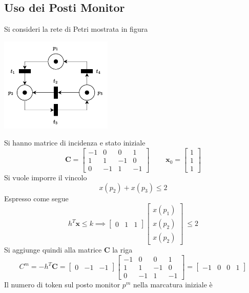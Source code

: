 \documentclass[10pt, letterpaper]{report}
\begin{document}
\subsection{Uso dei Posti Monitor}
Si consideri la rete di Petri mostrata in figura
\begin{center}
    \includegraphics[width=0.4\textwidth]{images/UsoMonitor.drawio.pdf}
\end{center}
Si hanno matrice di incidenza e stato iniziale
$$ \mathbf C=\begin{bmatrix}
    -1 & 0 & 0 & 1\\ 
    1 & 1 & -1 & 0\\ 
    0 & -1 & 1 & -1
\end{bmatrix} \ \ \ \ \ \ \  \ \ \  \mathbf x_0=\begin{bmatrix}
    1 \\ 1 \\ 1
\end{bmatrix}$$
Si vuole imporre il vincolo 
$$ x(p_2)+x(p_3)\le 2$$
Espresso come segue 
$$h^T\mathbf x \le k \implies \begin{bmatrix}
    0 & 1 & 1
\end{bmatrix}\begin{bmatrix}
    x(p_1) \\ x(p_2) \\ x(p_2)
\end{bmatrix}\ \le 2$$
Si aggiunge quindi alla matrice $\mathbf C$ la riga 
$$ C^m=-h^T\mathbf C =\begin{bmatrix}
    0 & -1 & -1
\end{bmatrix}\begin{bmatrix}
    -1 & 0 & 0 & 1\\ 
    1 & 1 & -1 & 0\\ 
    0 & -1 & 1 & -1
\end{bmatrix} =\begin{bmatrix}
    -1 &0 & 0 & 1
\end{bmatrix}$$
Il numero di token sul posto monitor $p^m$ nella marcatura iniziale è 
\end{document}
